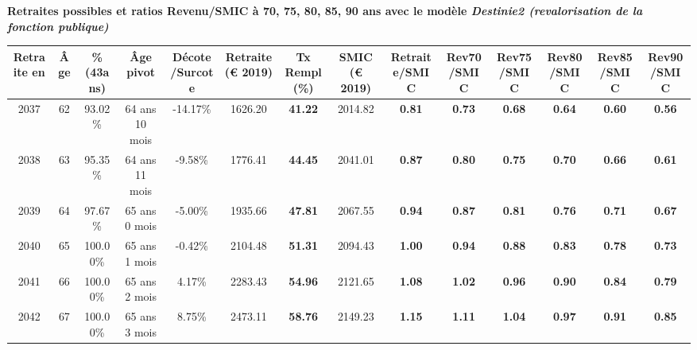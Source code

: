  \vspace{0.1cm} 
{\bf \noindent Retraites possibles et ratios Revenu/SMIC à 70, 75, 80, 85, 90 ans avec le modèle \emph{Destinie2 (revalorisation de la fonction publique)}}  
 
\begin{adjustbox}{max width=\textwidth} 
\begin{tabular}[htb]{|c|c||c|c|c||c|c||c||c|c|c|c|c|c|} 
\hline 
 Retraite en &  Âge &  \%(43ans) &  Âge pivot &  Décote/Surcote &  Retraite (\euro{} 2019) &  Tx Rempl(\%) &  SMIC (\euro{} 2019) &  Retraite/SMIC &  Rev70/SMIC &  Rev75/SMIC &  Rev80/SMIC &  Rev85/SMIC &  Rev90/SMIC \\ 
\hline \hline 
 2037 &  62 &  93.02\% &  64 ans 10 mois &  -14.17\% &  1626.20 &  {\bf 41.22} &  2014.82 &  {\bf {\color{red} 0.81}} &  {\bf {\color{red} 0.73}} &  {\bf {\color{red} 0.68}} &  {\bf {\color{red} 0.64}} &  {\bf {\color{red} 0.60}} &  {\bf {\color{red} 0.56}} \\ 
\hline 
 2038 &  63 &  95.35\% &  64 ans 11 mois &  -9.58\% &  1776.41 &  {\bf 44.45} &  2041.01 &  {\bf {\color{red} 0.87}} &  {\bf {\color{red} 0.80}} &  {\bf {\color{red} 0.75}} &  {\bf {\color{red} 0.70}} &  {\bf {\color{red} 0.66}} &  {\bf {\color{red} 0.61}} \\ 
\hline 
 2039 &  64 &  97.67\% &  65 ans 0 mois &  -5.00\% &  1935.66 &  {\bf 47.81} &  2067.55 &  {\bf {\color{red} 0.94}} &  {\bf {\color{red} 0.87}} &  {\bf {\color{red} 0.81}} &  {\bf {\color{red} 0.76}} &  {\bf {\color{red} 0.71}} &  {\bf {\color{red} 0.67}} \\ 
\hline 
 2040 &  65 &  100.00\% &  65 ans 1 mois &  -0.42\% &  2104.48 &  {\bf 51.31} &  2094.43 &  {\bf 1.00} &  {\bf {\color{red} 0.94}} &  {\bf {\color{red} 0.88}} &  {\bf {\color{red} 0.83}} &  {\bf {\color{red} 0.78}} &  {\bf {\color{red} 0.73}} \\ 
\hline 
 2041 &  66 &  100.00\% &  65 ans 2 mois &  4.17\% &  2283.43 &  {\bf 54.96} &  2121.65 &  {\bf 1.08} &  {\bf 1.02} &  {\bf {\color{red} 0.96}} &  {\bf {\color{red} 0.90}} &  {\bf {\color{red} 0.84}} &  {\bf {\color{red} 0.79}} \\ 
\hline 
 2042 &  67 &  100.00\% &  65 ans 3 mois &  8.75\% &  2473.11 &  {\bf 58.76} &  2149.23 &  {\bf 1.15} &  {\bf 1.11} &  {\bf 1.04} &  {\bf {\color{red} 0.97}} &  {\bf {\color{red} 0.91}} &  {\bf {\color{red} 0.85}} \\ 
\hline 
\hline 
\end{tabular} 
\end{adjustbox} 
 
